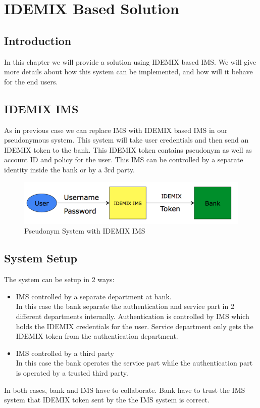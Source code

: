 \chapter{IDEMIX Based Solution}
\section{Introduction}
In this chapter we will provide a solution using IDEMIX based IMS. We will give more details about how this system can be implemented, and how will it behave for the end users.
\section{IDEMIX IMS}
As in previous case we can replace IMS with IDEMIX based IMS in our pseudonymous system. This system will take user credentials and then send an IDEMIX token to the bank. This IDEMIX token contains pseudonym as well as account ID and policy for the user. This IMS can be controlled by a separate identity inside the bank or by a 3rd party.
\begin{figure}[h]
	\centering
	\includegraphics[width=\textwidth]{figures/IDEMIX}
	\caption{Pseudonym System with IDEMIX IMS}
	\label{fig:IDEMIX}
\end{figure}
\section{System Setup}
The system can be setup in 2 ways:
\begin{itemize}
	\item IMS controlled by a separate department at bank.\\
	In this case the bank separate the authentication and service part in 2 different departments internally. Authentication is controlled by IMS which holds the IDEMIX credentials for the user. Service department only gets the IDEMIX token from the authentication department.
	\item IMS controlled by a third party\\
	In this case the bank operates the service part while the authentication part is operated by a trusted third party.
\end{itemize}
In both cases, bank and IMS have to collaborate. Bank have to trust the IMS system that IDEMIX token sent by the the IMS system is correct.
